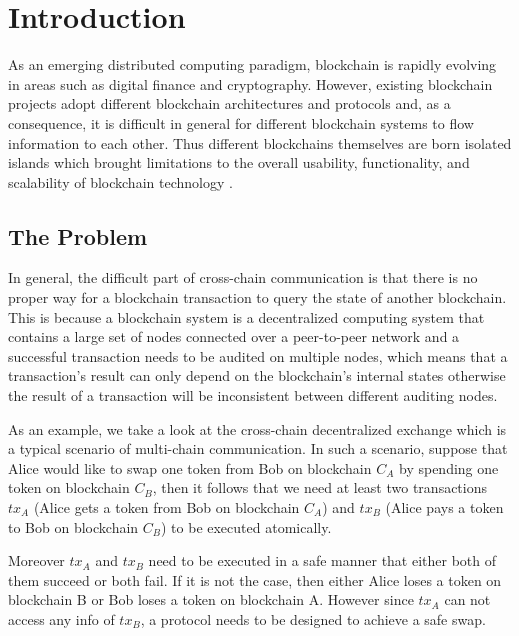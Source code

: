 \section{Introduction}
As an emerging distributed computing paradigm, blockchain is rapidly evolving in areas such as digital finance and cryptography. However, existing blockchain projects adopt different blockchain architectures and protocols and, as a consequence, it is difficult in general for different blockchain systems to flow information to each other. Thus different blockchains themselves are born isolated islands which brought limitations to the overall usability, functionality, and scalability of blockchain technology  \cite{anati2013innovative}.

\subsection{The Problem}
In general, the difficult part of cross-chain communication is that there is no proper way for a blockchain transaction to query the state of another blockchain. This is because a blockchain system is a decentralized computing system that contains a large set of nodes connected over a peer-to-peer network and a successful transaction needs to be audited on multiple nodes, which means that a transaction's result can only depend on the blockchain's internal states otherwise the result of a transaction will be inconsistent between different auditing nodes. 

As an example, we take a look at the cross-chain decentralized exchange\cite{} which is a typical scenario of multi-chain communication. In such a scenario, suppose that Alice would like to swap one token from Bob on blockchain $C_A$ by spending one token on blockchain $C_B$, then it follows that we need at least two transactions $tx_A$ (Alice gets a token from Bob on blockchain $C_A$) and $tx_B$ (Alice pays a token to Bob on blockchain $C_B$) to be executed atomically.

Moreover $tx_A$ and $tx_B$ need to be executed in a safe manner that either both of them succeed or both fail. If it is not the case, then either Alice loses a token on blockchain B or Bob loses a token on blockchain A. However since $tx_A$ can not access any info of $tx_B$, a protocol needs to be designed to achieve a safe swap.


